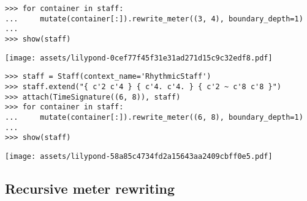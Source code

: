 \begin{comment}
<abjad>
for container in staff:
    mutate(container[:]).rewrite_meter((3, 4), boundary_depth=1)

show(staff)
</abjad>
\end{comment}

\begin{singlespacing}
\vspace{-0.5\baselineskip}
\begin{lstlisting}
>>> for container in staff:
...     mutate(container[:]).rewrite_meter((3, 4), boundary_depth=1)
...
>>> show(staff)
\end{lstlisting}
\texttt{[image: assets/lilypond-0cef77f45f31e31ad271d15c9c32edf8.pdf]}
\end{singlespacing}

\begin{comment}
<abjad>
staff = Staff(context_name='RhythmicStaff')
staff.extend("{ c'2 c'4 } { c'4. c'4. } { c'2 ~ c'8 c'8 }")
attach(TimeSignature((6, 8)), staff)
for container in staff:
    mutate(container[:]).rewrite_meter((6, 8), boundary_depth=1)

show(staff)
</abjad>
\end{comment}

\begin{singlespacing}
\vspace{-0.5\baselineskip}
\begin{lstlisting}
>>> staff = Staff(context_name='RhythmicStaff')
>>> staff.extend("{ c'2 c'4 } { c'4. c'4. } { c'2 ~ c'8 c'8 }")
>>> attach(TimeSignature((6, 8)), staff)
>>> for container in staff:
...     mutate(container[:]).rewrite_meter((6, 8), boundary_depth=1)
...
>>> show(staff)
\end{lstlisting}
\texttt{[image: assets/lilypond-58a85c4734fd2a15643aa2409cbff0e5.pdf]}
\end{singlespacing}

\subsection{Recursive meter rewriting} %

\begin{comment}
<abjad>
parseable = "abj: | 4/4 c'16 ~ c'4 d'8. ~ "
parseable += "2/3 { d'8. ~ 3/5 { d'16 e'8 ~ e'16 f'16 ~ } } "
parseable += "f'4 |"
measure = parse(parseable)
show(measure)
</abjad>
\end{comment}


